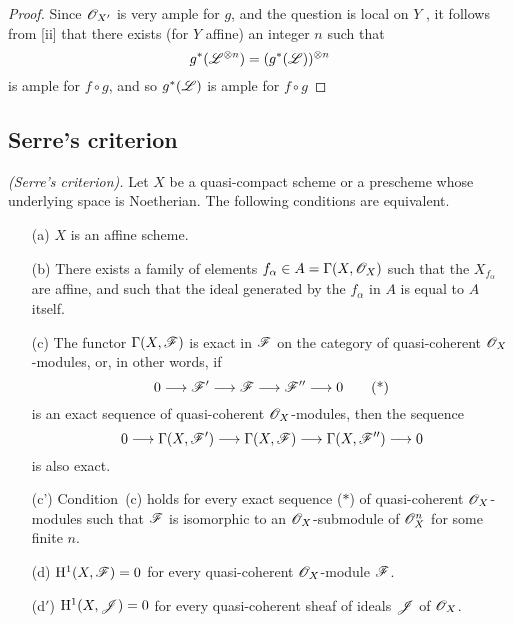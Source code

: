 \begin{proof}
Since $\mathscr{O}_{X'}$ is very ample for $g$, and the question is local on $Y$ , it follows from [ii] that there exists (for $Y$ affine) an integer $n$ such that
\[
  g^*(\mathscr{L}^{\otimes n})=(g^*(\mathscr{L}))^{\otimes n}
\]
is ample for $f\circ g$, and so $g^*(\mathscr{L})$ is ample for $f\circ g$ 
\end{proof}

\subsection{Serre's criterion}
\label{subsection:II.5.2}

\begin{theorem}[5.2.1]
\label{II.5.2.1}
\emph{(Serre's criterion).}
Let $X$ be a quasi-compact scheme or a prescheme whose underlying space is Noetherian.
The following conditions are equivalent.
\begin{enumerate}
  \item[{\rm(a)}] $X$ is an affine scheme.
  \item[{\rm(b)}] There exists a family of elements $f_\alpha\in A=\Gamma(X,\mathscr{O}_X)$ such that the $X_{f_\alpha}$ are affine, and such that the ideal generated by the $f_\alpha$ in $A$ is equal to $A$ itself.
  \item[{\rm(c)}] The functor $\Gamma(X,\mathscr{F})$ is exact in $\mathscr{F}$ on the category of quasi-coherent $\mathscr{O}_X$-modules, or, in other words, if
    \[
      0\to\sh{F}'\to\sh{F}\to\sh{F}''\to 0
      \tag{*}
    \]
    is an exact sequence of quasi-coherent $\mathscr{O}_X$-modules, then the sequence
    \[
     0\to\Gamma(X,\sh{F}')\to\Gamma(X,\sh{F})\to\Gamma(X,\sh{F}'')\to 0
    \]
    is also exact.
  \item[{\rm(c')}] Condition~{\rm(c)} holds for every exact sequence {\rm($*$)} of quasi-coherent $\mathscr{O}_X$-modules such that $\mathscr{F}$ is isomorphic to an $\mathscr{O}_X$-submodule of $\mathscr{O}_X^n$ for some finite $n$.
  \item[{\rm(d)}] $\mathrm{H}^1(X,\mathscr{F})=0$ for every quasi-coherent $\mathscr{O}_X$-module $\mathscr{F}$.
  \item[{\rm(d$'$)}] $\mathrm{H}^1(X,\mathscr{J})=0$ for every quasi-coherent sheaf of ideals $\mathscr{J}$ of $\mathscr{O}_X$.
\end{enumerate}
\end{theorem}

